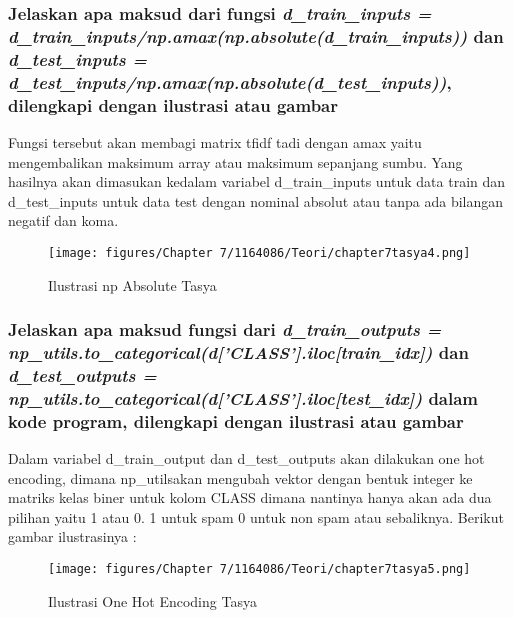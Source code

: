 \subsubsection{Jelaskan apa maksud dari fungsi \emph{d\_train\_inputs = d\_train\_inputs/np.amax(np.absolute(d\_train\_inputs))} dan \emph{d\_test\_inputs = d\_test\_inputs/np.amax(np.absolute(d\_test\_inputs))}, dilengkapi dengan ilustrasi atau gambar}

Fungsi tersebut akan membagi matrix tfidf tadi dengan amax yaitu mengembalikan maksimum array atau maksimum sepanjang sumbu. Yang hasilnya akan dimasukan kedalam variabel d\_train\_inputs untuk data train dan d\_test\_inputs untuk data test dengan nominal absolut atau tanpa ada bilangan negatif dan koma.
\begin{figure}[ht]
\centering
\texttt{[image: figures/Chapter 7/1164086/Teori/chapter7tasya4.png]}
\caption{Ilustrasi np Absolute Tasya}
\label{Teori}
\end{figure}

\subsubsection{Jelaskan apa maksud fungsi dari \emph{d\_train\_outputs = np\_utils.to\_categorical(d['CLASS'].iloc[train\_idx])} dan \emph{d\_test\_outputs = np\_utils.to\_categorical(d['CLASS'].iloc[test\_idx])} dalam kode program, dilengkapi dengan ilustrasi atau gambar}

Dalam variabel d\_train\_output dan d\_test\_outputs akan dilakukan one hot encoding, dimana np\_utilsakan mengubah vektor dengan bentuk integer ke matriks kelas biner untuk kolom CLASS dimana nantinya hanya akan ada dua pilihan yaitu 1 atau 0. 1 untuk spam 0 untuk non spam atau sebaliknya. Berikut gambar ilustrasinya :
\begin{figure}[ht]
\centering
\texttt{[image: figures/Chapter 7/1164086/Teori/chapter7tasya5.png]}
\caption{Ilustrasi One Hot Encoding Tasya}
\label{Teori}
\end{figure}

